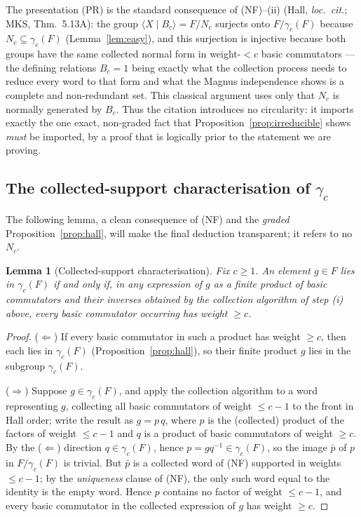 \documentclass{amsart}
\newtheorem{lemma}{Lemma}
\theoremstyle{definition}
\theoremstyle{remark}
\begin{document}
The presentation (PR) is the standard consequence of (NF)--(ii) (Hall, \emph{loc.\ cit.};
MKS, Thm.~5.13A): the group $\langle X\mid B_c\rangle=F/N_c$ surjects onto $F/\gamma_c(F)$
because $N_c\subseteq\gamma_c(F)$ (Lemma~\ref{lem:easy}), and this surjection is injective
because both groups have the same collected normal form in weight-$<c$ basic commutators --- the
defining relations $B_c=1$ being exactly what the collection process needs to reduce every word
to that form and what the Magnus independence shows is a complete and non-redundant set. This
classical argument uses only that $N_c$ is normally generated by $B_c$. Thus the citation
introduces no circularity: it imports exactly the one exact, non-graded fact that
Proposition~\ref{prop:irreducible} shows \emph{must} be imported, by a proof that is logically
prior to the statement we are proving.

\subsection*{The collected-support characterisation of $\gamma_c$}

The following lemma, a clean consequence of (NF) and the \emph{graded}
Proposition~\ref{prop:hall}, will make the final deduction transparent; it refers to no $N_c$.

\begin{lemma}[Collected-support characterisation]\label{lem:support}
Fix $c\ge1$. An element $g\in F$ lies in $\gamma_c(F)$ if and only if, in any expression of
$g$ as a finite product of basic commutators and their inverses obtained by the collection
algorithm of step \textup{(i)} above, every basic commutator occurring has weight $\ge c$.
\end{lemma}
\begin{proof}
($\Leftarrow$) If every basic commutator in such a product has weight $\ge c$, then each lies
in $\gamma_c(F)$ (Proposition~\ref{prop:hall}), so their finite product $g$ lies in the
subgroup $\gamma_c(F)$.

($\Rightarrow$) Suppose $g\in\gamma_c(F)$, and apply the collection algorithm to a word
representing $g$, collecting all basic commutators of weight $\le c-1$ to the front in Hall
order; write the result as $g=p\,q$, where $p$ is the (collected) product of the factors of
weight $\le c-1$ and $q$ is a product of basic commutators of weight $\ge c$. By the
($\Leftarrow$) direction $q\in\gamma_c(F)$, hence $p=gq^{-1}\in\gamma_c(F)$, so the image
$\bar p$ of $p$ in $F/\gamma_c(F)$ is trivial. But $\bar p$ is a collected word of (NF) supported
in weights $\le c-1$; by the \emph{uniqueness} clause of (NF), the only such word equal to the
identity is the empty word. Hence $p$ contains no factor of weight $\le c-1$, and every basic
commutator in the collected expression of $g$ has weight $\ge c$.
\end{proof}
\end{document}
